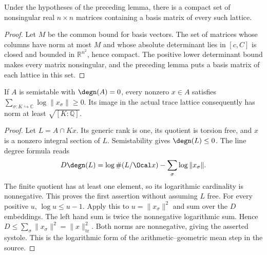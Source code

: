 \begin{lemma}
\label{lem:mahler-frames}
\leanok
{}
Under the hypotheses of the preceding lemma, there is a compact set
of nonsingular real $n\times n$ matrices containing a basis matrix of
every such lattice.
\end{lemma}
\begin{proof}
Let $M$ be the common bound for basis vectors. The set of matrices whose
columns have norm at most $M$ and whose absolute determinant lies in
$[c,C]$ is closed and bounded in $\mathbb R^{n^2}$, hence compact.
The positive lower determinant bound makes every matrix nonsingular,
and the preceding lemma puts a basis matrix of each lattice in this set.
\end{proof}

\begin{lemma}
\label{lem:trace-semistable-systole}
\leanok
If $A$ is semistable with $\degn(A)=0$, every nonzero $x\in A$
satisfies $\sum_{\sigma:K\hookrightarrow\mathbb C}\log\|x_\sigma\|\geq0$.
Its image in the actual trace lattice consequently has norm at least
$\sqrt{[K:\mathbb Q]}$.
\end{lemma}
\begin{proof}
Let $L=A\cap Kx$. Its generic rank is one, its quotient is torsion free,
and $x$ is a nonzero integral section of $L$. Semistability gives
$\degn(L)\leq0$. The line degree formula reads
\[
 D\degn(L)=\log\#(L/\Ocal x)-\sum_\sigma\log\|x_\sigma\|.
\]
The finite quotient has at least one element, so its logarithmic cardinality
is nonnegative. This proves the first assertion without assuming $L$ free.
For every positive $u$, $\log u\leq u-1$. Apply this to
$u=\|x_\sigma\|^2$ and sum over the $D$ embeddings. The left hand
sum is twice the nonnegative logarithmic sum. Hence
$D\leq\sum_\sigma\|x_\sigma\|^2=\|x\|_{\mathrm{tr}}^2$.
Both norms are nonnegative, giving the asserted systole. This is the
logarithmic form of the arithmetic--geometric mean step in the source.
\end{proof}

